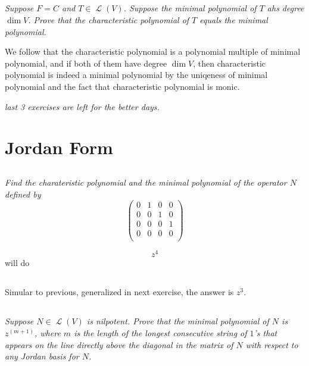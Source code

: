 \documentclass[11pt,oneside,titlepage]{book}
\DeclareMathOperator \map {\mathcal {L}}
\begin{document}
\subsection{}

\textit{Suppose $F = C$ and $T \in \map(V)$. Suppose the minimal polynomial of
  $T$ ahs degree $\dim V$. Prove that the characteristic polynomial of $T$ equals the minimal
  polynomial.}

We follow that the characteristic polynomial is a polynomial multiple of minimal polynomial,
and if both of them have degree $\dim V$, then characteristic polynomial is indeed a
minimal polynomial by the uniqeness of minimal polynomial and the fact that
characteristic polynomial is monic.

\textit{last 3 exercises are left for the better days.}

\section{Jordan Form}

\subsection{}

\textit{Find the charateristic polynomial and the minimal polynomial of the operator $N$
  defined by
  $$
  \begin{pmatrix}
    0 & 1 & 0 & 0 \\
    0 & 0 & 1 & 0 \\
    0 & 0 & 0 & 1 \\
    0 & 0 & 0 & 0 \\
  \end{pmatrix}
  $$
}

$$z^4$$ will do

\subsection{}

Simular to previous, generalized in next exercise, the answer is $z^3$.

\subsection{}

\textit{Suppose $N \in \map(V)$ is nilpotent. Prove that the minimal polynomial of $N$ is
  $z^(m + 1)$, where $m$ is the length of the longest consecutive string of $1$'s that appears
  on the line directly above the diagonal in the matrix of $N$ with respect to any Jordan basis
  for $N$.}
\end{document}
